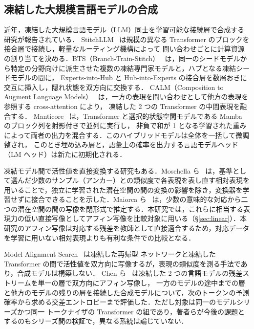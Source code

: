 \documentclass[techrep,noauthor]{ipsj}
\begin{document}
\subsection{凍結した大規模言語モデルの合成}
近年，凍結した大規模言語モデル（LLM）同士を学習可能な接続層で合成する研究が報告されている．
StitchLLM~\cite{hu-etal-2025-stitchllm} は規模の異なる Transformer のブロックを接合層で接続し，軽量なルーティング機構によって
問い合わせごとに計算資源の割り当てを決める．BTS（Branch-Train-Stitch）~\cite{zhang-etal-2025-bts} は，同一のシードモデルから特定の分野向けに派生させた複数の凍結専門家モデルと，ハブとなる凍結シードモデルの間に，
Experts-into-Hub と Hub-into-Experts の接合層を数層おきに交互に挿入し，隠れ状態を双方向に交換する．
CALM（Composition to Augment Language Models）~\cite{bansal2024llm} は，一方の表現を問い合わせとして他方の表現を参照する cross-attention により，
凍結した 2 つの Transformer の中間表現を融合する．
Manticore~\cite{roberts2025pretrained} は，Transformer と選択的状態空間モデルである Mamba のブロック列を射影付きで並列に実行し，
非負で和が 1 となる学習された重みによって両者の出力を混合する．このハイブリッドモデルは全体を一括して微調整され，
このとき埋め込み層と，語彙上の確率を出力する言語モデルヘッド（LM ヘッド）は新たに初期化される．

凍結モデル間で活性値を直接変換する研究もある．Moschella ら~\cite{moschella2023relative} は，基準として選んだ少数のサンプル（アンカー）との類似度で各表現を表し直す相対表現を用いることで，独立に学習された潜在空間の間の変換の影響を除き，変換器を学習せずに接合できることを示した．Maiorca ら~\cite{3666122.3668540} は，少数の意味的な対応から二つの潜在空間の間の写像を閉形式で推定する．本研究では，これらに相当する表現力の低い直接写像としてアフィン写像を比較対象に用いる（\S\ref{sec:linear}）．本研究のアフィン写像は対応する残差を教師として直接適合するため，対応データを学習に用いない相対表現よりも有利な条件での比較となる．

Model Alignment Search~\cite{grant2025model} は凍結した再帰型
ネットワークと凍結した Transformer の間で活性値を双方向に写像するが，表現の類似度を測る手法であり，合成モデルは構築しない．
Chen ら~\cite{chen2025transferring} は凍結した 2 つの言語モデルの残差ストリームを単一の層で双方向にアフィン写像し，
一方のモデルの途中までの層と他方のモデルの残りの層を接続した合成モデルについて，次のトークンの予測確率から求める交差エントロピーまで評価した．ただし対象は同一のモデルシリーズかつ同一
トークナイザの Transformer の組であり，著者らが今後の課題とするのもシリーズ間の検証で，異なる系統は論じていない．
\end{document}
